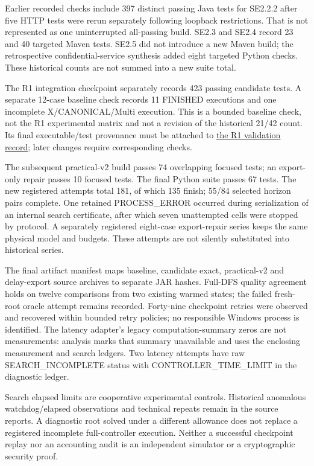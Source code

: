\documentclass[11pt]{article}
\begin{document}
Earlier recorded checks include 397 distinct passing Java tests for SE2.2.2 after five HTTP tests were rerun separately following loopback restrictions. That is not represented as one uninterrupted all-passing build. SE2.3 and SE2.4 record 23 and 40 targeted Maven tests. SE2.5 did not introduce a new Maven build; the retrospective confidential-service synthesis added eight targeted Python checks. These historical counts are not summed into a new suite total.

The R1 integration checkpoint separately records 423 passing candidate tests. A separate 12-case baseline check records 11 FINISHED executions and one incomplete X/CANONICAL/Multi execution. This is a bounded baseline check, not the R1 experimental matrix and not a revision of the historical 21/42 count. Its final executable/test provenance must be attached to \href{../research-audit/results/validation.json}{the R1 validation record}; later changes require corresponding checks.

The subsequent practical-v2 build passes 74 overlapping focused tests; an export-only repair passes 10 focused tests. The final Python suite passes 67 tests. The new registered attempts total 181, of which 135 finish; 55/84 selected horizon pairs complete. One retained PROCESS\_ERROR occurred during serialization of an internal search certificate, after which seven unattempted cells were stopped by protocol. A separately registered eight-case export-repair series keeps the same physical model and budgets. These attempts are not silently substituted into historical series.

The final artifact manifest maps baseline, candidate exact, practical-v2 and delay-export source archives to separate JAR hashes. Full-DFS quality agreement holds on twelve comparisons from two existing warmed states; the failed fresh-root oracle attempt remains recorded. Forty-nine checkpoint retries were observed and recovered within bounded retry policies; no responsible Windows process is identified. The latency adapter's legacy computation-summary zeros are not measurements: analysis marks that summary unavailable and uses the enclosing measurement and search ledgers. Two latency attempts have raw SEARCH\_INCOMPLETE status with CONTROLLER\_TIME\_LIMIT in the diagnostic ledger.

Search elapsed limits are cooperative experimental controls. Historical anomalous watchdog/elapsed observations and technical repeats remain in the source reports. A diagnostic root solved under a different allowance does not replace a registered incomplete full-controller execution. Neither a successful checkpoint replay nor an accounting audit is an independent simulator or a cryptographic security proof.
\end{document}
